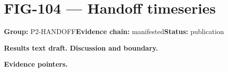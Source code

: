 \clearpage
\section{FIG-104 --- Handoff timeseries}
\label{figpage:fig-104}
\textbf{Group:} P2-HANDOFF\quad \textbf{Evidence chain:} manifested\quad \textbf{Status:} publication

\textbf{Results text draft.} 
\textbf{Discussion and boundary.} 


\textbf{Evidence pointers.}



\vfill
